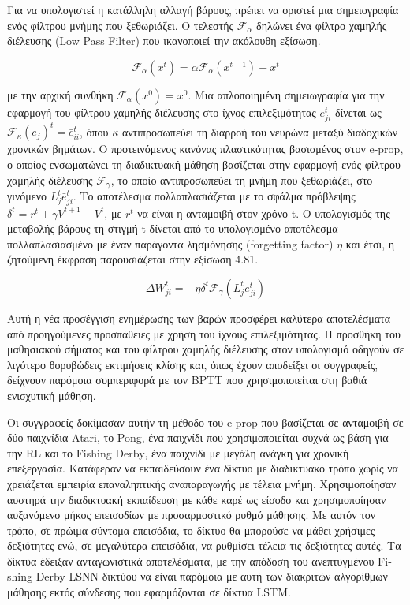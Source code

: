 \documentclass[12pt]{report}
\begin{document}
Για να υπολογιστεί η κατάλληλη αλλαγή βάρους, πρέπει να οριστεί μια σημειογραφία ενός φίλτρου μνήμης που ξεθωριάζει. Ο τελεστής \(\mathcal{F}_\alpha\) δηλώνει ένα φίλτρο χαμηλής διέλευσης \textlatin{(Low Pass Filter)} που ικανοποιεί την ακόλουθη εξίσωση.

\begin{equation}
    \mathcal{F}_{\alpha}\left(x^{t}\right)=\alpha \mathcal{F}_{\alpha}\left(x^{t-1}\right)+x^{t}
\end{equation}

με την αρχική συνθήκη \(\mathcal{F}_{\alpha}\left(x^{0}\right) = x^{0}\). Μια απλοποιημένη σημειωγραφία για την εφαρμογή του φίλτρου χαμηλής διέλευσης στο ίχνος επιλεξιμότητας \(e_{ji}^t\) δίνεται ως $\mathcal{F}_{\kappa}\left(e_{j}\right)^{t} = \bar{e}_{ii}^{t}$, όπου \(\kappa\) αντιπροσωπεύει τη διαρροή του νευρώνα μεταξύ διαδοχικών χρονικών βημάτων. Ο προτεινόμενος κανόνας πλαστικότητας βασισμένος στον \textlatin{e-prop}, ο οποίος ενσωματώνει τη διαδικτυακή μάθηση βασίζεται στην εφαρμογή ενός φίλτρου χαμηλής διέλευσης $\mathcal{F}_{\gamma}$, το οποίο αντιπροσωπεύει τη μνήμη που ξεθωριάζει, στο γινόμενο \(L_j^t\bar{e}_{ji}^t\). Το αποτέλεσμα πολλαπλασιάζεται με το σφάλμα πρόβλεψης $\delta^{t} = r^{t}+\gamma V^{t+1} -V^{t}$, με $r^t$ να είναι η ανταμοιβή στον χρόνο \textlatin{t}. Ο υπολογισμός της μεταβολής βάρους τη στιγμή \textlatin{t} δίνεται από το υπολογισμένο αποτέλεσμα πολλαπλασιασμένο με έναν παράγοντα λησμόνησης (\textlatin{forgetting factor}) $\eta$ και έτσι, η ζητούμενη έκφραση παρουσιάζεται στην εξίσωση 4.81.

\begin{equation}
    \Delta W_{j i}^{t}=-\eta \delta^{t} \mathcal{F}_{\gamma}\left(L_{j}^{t} e_{j i}^{t}\right)
\end{equation}

Αυτή η νέα προσέγγιση ενημέρωσης των βαρών προσφέρει καλύτερα αποτελέσματα από προηγούμενες προσπάθειες με χρήση του ίχνους επιλεξιμότητας. Η προσθήκη του μαθησιακού σήματος και του φίλτρου χαμηλής διέλευσης στον υπολογισμό οδηγούν σε λιγότερο θορυβώδεις εκτιμήσεις κλίσης και, όπως έχουν αποδείξει οι συγγραφείς, δείχνουν παρόμοια συμπεριφορά με τον \textlatin{BPTT} που χρησιμοποιείται στη βαθιά ενισχυτική μάθηση.

Οι συγγραφείς δοκίμασαν αυτήν τη μέθοδο του \textlatin{e-prop} που βασίζεται σε ανταμοιβή σε δύο παιχνίδια \textlatin{Atari}, το \textlatin{Pong}, ένα παιχνίδι που χρησιμοποιείται συχνά ως βάση για την \textlatin{RL} και το \textlatin{Fishing Derby}, ένα παιχνίδι με μεγάλη ανάγκη για χρονική επεξεργασία. Κατάφεραν να εκπαιδεύσουν ένα δίκτυο με διαδικτυακό τρόπο χωρίς να χρειάζεται εμπειρία επαναληπτικής αναπαραγωγής με τέλεια μνήμη. Χρησιμοποίησαν αυστηρά την διαδικτυακή εκπαίδευση με κάθε καρέ ως είσοδο και χρησιμοποίησαν αυξανόμενο μήκος επεισοδίων με προσαρμοστικό ρυθμό μάθησης. Με αυτόν τον τρόπο, σε πρώιμα σύντομα επεισόδια, το δίκτυο θα μπορούσε να μάθει χρήσιμες δεξιότητες ενώ, σε μεγαλύτερα επεισόδια, να ρυθμίσει τέλεια τις δεξιότητες αυτές. Τα δίκτυα έδειξαν ανταγωνιστικά αποτελέσματα, με την απόδοση του ανεπτυγμένου \textlatin{Fishing Derby LSNN} δικτύου να είναι παρόμοια με αυτή των διακριτών αλγορίθμων μάθησης εκτός σύνδεσης που εφαρμόζονται σε δίκτυα \textlatin{LSTM}.
\end{document}
